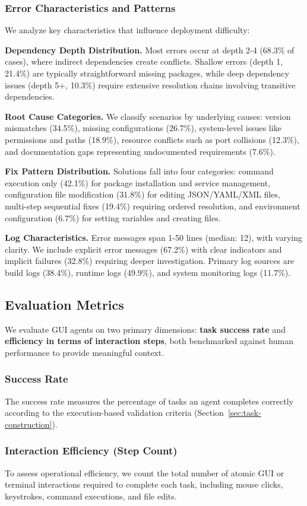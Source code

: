 \subsubsection{Error Characteristics and Patterns}

We analyze key characteristics that influence deployment difficulty:

\textbf{Dependency Depth Distribution.} Most errors occur at depth 2-4 (68.3\% of cases), where indirect dependencies create conflicts. Shallow errors (depth 1, 21.4\%) are typically straightforward missing packages, while deep dependency issues (depth 5+, 10.3\%) require extensive resolution chains involving transitive dependencies.

\textbf{Root Cause Categories.} We classify scenarios by underlying causes: version mismatches (34.5\%), missing configurations (26.7\%), system-level issues like permissions and paths (18.9\%), resource conflicts such as port collisions (12.3\%), and documentation gaps representing undocumented requirements (7.6\%).

\textbf{Fix Pattern Distribution.} Solutions fall into four categories: command execution only (42.1\%) for package installation and service management, configuration file modification (31.8\%) for editing JSON/YAML/XML files, multi-step sequential fixes (19.4\%) requiring ordered resolution, and environment configuration (6.7\%) for setting variables and creating files.

\textbf{Log Characteristics.} Error messages span 1-50 lines (median: 12), with varying clarity. We include explicit error messages (67.2\%) with clear indicators and implicit failures (32.8\%) requiring deeper investigation. Primary log sources are build logs (38.4\%), runtime logs (49.9\%), and system monitoring logs (11.7\%).


\subsection{Evaluation Metrics}

We evaluate GUI agents on two primary dimensions: \textbf{task success rate} and \textbf{efficiency in terms of interaction steps}, both benchmarked against human performance to provide meaningful context.

\subsubsection{Success Rate}

The success rate measures the percentage of tasks an agent completes correctly according to the execution-based validation criteria (Section~\ref{sec:task-construction}). 


\subsubsection{Interaction Efficiency (Step Count)}

To assess operational efficiency, we count the total number of atomic GUI or terminal interactions required to complete each task, including mouse clicks, keystrokes, command executions, and file edits. 